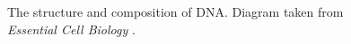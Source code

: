 \documentclass{cshonours}
\begin{document}
\begin{figure}
\begin{center}
\end{center}
\caption{The structure and composition of DNA. Diagram taken from \emph{Essential Cell Biology} \cite{albertsessential}.}
\label{dna}
\end{figure}
\end{document}
